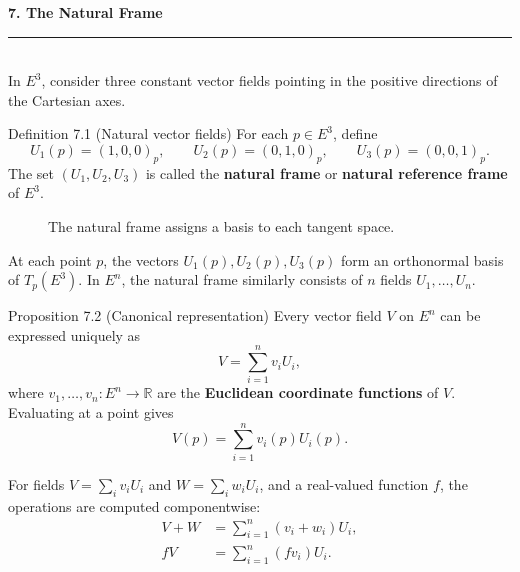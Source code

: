 \documentclass[11pt,letterpaper]{article}
\newcommand{\manualsection}[1]{%
  \Needspace{12\baselineskip}%
  \vspace{0.35cm}
  {\Large\bfseries\color{blackmain} #1}\\[2pt]
  {\color{orangeacc}\rule{\linewidth}{1.4pt}}\\[0.25cm]
}
\newcommand{\term}[1]{\textbf{\color{orangeacc}#1}}
\begin{document}
\manualsection{7. The Natural Frame}

In $E^3$, consider three constant vector fields pointing in the positive
directions of the Cartesian axes.

\begin{infobox}[blackmain]{Definition 7.1 (Natural vector fields)}
For each $p\in E^3$, define
\begin{equation}
  U_1(p)=(1,0,0)_p,\qquad
  U_2(p)=(0,1,0)_p,\qquad
  U_3(p)=(0,0,1)_p.
\end{equation}
The set $(U_1,U_2,U_3)$ is called the \term{natural frame} or
\term{natural reference frame} of $E^3$.
\end{infobox}

\begin{figure}[htbp]
\centering
{}
\caption{The natural frame assigns a basis to each tangent space.}
\label{fig:natural-frame}
\end{figure}
\FloatBarrier

At each point $p$, the vectors $U_1(p),U_2(p),U_3(p)$ form an orthonormal basis of
$T_p(E^3)$. In $E^n$, the natural frame similarly consists of $n$ fields
$U_1,\ldots,U_n$.

\begin{theorembox}{Proposition 7.2 (Canonical representation)}
Every vector field $V$ on $E^n$ can be expressed uniquely as
\begin{equation}
  V=\sum_{i=1}^{n}v_iU_i,
\end{equation}
where $v_1,\ldots,v_n:E^n\to\mathbb R$ are the \term{Euclidean coordinate
functions} of $V$. Evaluating at a point gives
\begin{equation}
  V(p)=\sum_{i=1}^{n}v_i(p)U_i(p).
\end{equation}
\end{theorembox}

For fields $V=\sum_i v_iU_i$ and $W=\sum_i w_iU_i$, and a real-valued function
$f$, the operations are computed componentwise:
\begin{align}
  V+W&=\sum_{i=1}^{n}(v_i+w_i)U_i,\\
  fV&=\sum_{i=1}^{n}(fv_i)U_i.
\end{align}
\end{document}

